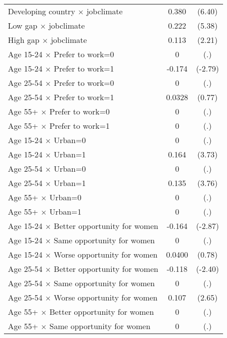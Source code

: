 {\begin{longtable}{l*{1}{cc}}
Developing country $\times$ jobclimate&       0.380\sym{***}&      (6.40)\\
Low gap $\times$ jobclimate&       0.222\sym{***}&      (5.38)\\
High gap $\times$ jobclimate&       0.113\sym{*}  &      (2.21)\\
Age 15-24 $\times$ Prefer to work=0&           0         &         (.)\\
Age 15-24 $\times$ Prefer to work=1&      -0.174\sym{**} &     (-2.79)\\
Age 25-54 $\times$ Prefer to work=0&           0         &         (.)\\
Age 25-54 $\times$ Prefer to work=1&      0.0328         &      (0.77)\\
Age 55+ $\times$ Prefer to work=0&           0         &         (.)\\
Age 55+ $\times$ Prefer to work=1&           0         &         (.)\\
Age 15-24 $\times$ Urban=0&           0         &         (.)\\
Age 15-24 $\times$ Urban=1&       0.164\sym{***}&      (3.73)\\
Age 25-54 $\times$ Urban=0&           0         &         (.)\\
Age 25-54 $\times$ Urban=1&       0.135\sym{***}&      (3.76)\\
Age 55+ $\times$ Urban=0&           0         &         (.)\\
Age 55+ $\times$ Urban=1&           0         &         (.)\\
Age 15-24 $\times$ Better opportunity for women&      -0.164\sym{**} &     (-2.87)\\
Age 15-24 $\times$ Same opportunity for women&           0         &         (.)\\
Age 15-24 $\times$ Worse opportunity for women&      0.0400         &      (0.78)\\
Age 25-54 $\times$ Better opportunity for women&      -0.118\sym{*}  &     (-2.40)\\
Age 25-54 $\times$ Same opportunity for women&           0         &         (.)\\
Age 25-54 $\times$ Worse opportunity for women&       0.107\sym{**} &      (2.65)\\
Age 55+ $\times$ Better opportunity for women&           0         &         (.)\\
Age 55+ $\times$ Same opportunity for women&           0         &         (.)\\

\end{longtable}}
